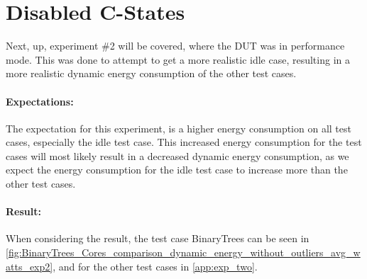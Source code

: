 \section{Disabled C-States}

Next, up, experiment \#2 will be covered, where the DUT was in performance mode. This was done to attempt to get a more realistic idle case, resulting in a more realistic dynamic energy consumption of the other test cases.

\paragraph*{Expectations:} The expectation for this experiment, is a higher energy consumption on all test cases, especially the idle test case. This increased energy consumption for the test cases will most likely result in a decreased dynamic energy consumption, as we expect the energy consumption for the idle test case to increase more than the other test cases.

\paragraph*{Result:} When considering the result, the test case BinaryTrees can be seen in \cref{fig:BinaryTrees_Cores_comparison_dynamic_energy_without_outliers_avg_watts_exp2}, and for the other test cases in \cref{app:exp_two}.


%
%
